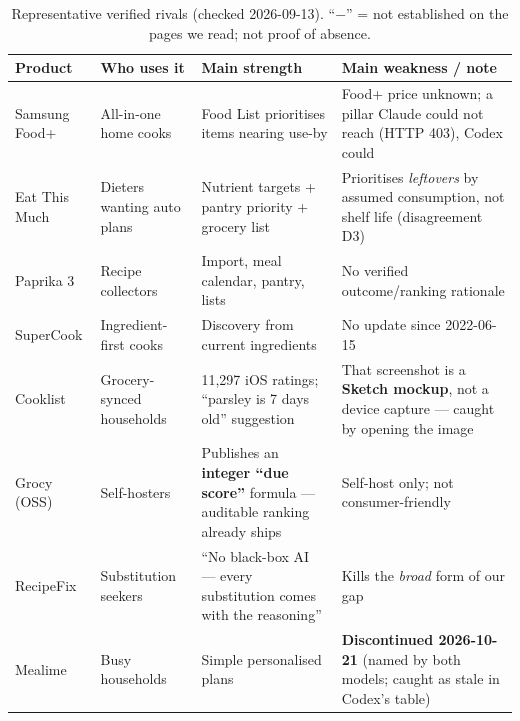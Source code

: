 \documentclass[sigconf,nonacm]{acmart}
\begin{document}
\begin{table}[t]\footnotesize\centering
\caption{Representative verified rivals (checked 2026-09-13). ``$-$'' = not established on the pages we read; not proof of absence.}
\label{tab:rivals}
\begin{tabular}{@{}p{2.5cm}p{3.3cm}p{4.7cm}p{4.7cm}@{}}
\toprule
\textbf{Product} & \textbf{Who uses it} & \textbf{Main strength} & \textbf{Main weakness / note} \\
\midrule
Samsung Food+ \cite{samsungfood} & All-in-one home cooks & Food List prioritises items nearing use-by & Food+ price unknown; a pillar Claude could not reach (HTTP 403), Codex could \\
Eat This Much \cite{eatthismuch} & Dieters wanting auto plans & Nutrient targets + pantry priority + grocery list & Prioritises \emph{leftovers} by assumed consumption, not shelf life (disagreement D3) \\
Paprika 3 \cite{paprika} & Recipe collectors & Import, meal calendar, pantry, lists & No verified outcome/ranking rationale \\
SuperCook & Ingredient-first cooks & Discovery from current ingredients & No update since 2022-06-15 \\
Cooklist \cite{cooklist} & Grocery-synced households & 11{,}297 iOS ratings; ``parsley is 7 days old'' suggestion & That screenshot is a \textbf{Sketch mockup}, not a device capture --- caught by opening the image \\
Grocy \cite{grocy} (OSS) & Self-hosters & Publishes an \textbf{integer ``due score''} formula --- auditable ranking already ships & Self-host only; not consumer-friendly \\
RecipeFix \cite{recipefix} & Substitution seekers & ``No black-box AI --- every substitution comes with the reasoning'' & Kills the \emph{broad} form of our gap \\
Mealime & Busy households & Simple personalised plans & \textbf{Discontinued 2026-10-21} (named by both models; caught as stale in Codex's table) \\
\bottomrule
\end{tabular}
\end{table}
\end{document}
